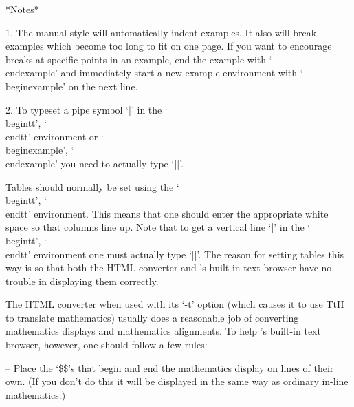 *Notes*

\beginlist%

\item{1.}
The manual style will automatically indent examples. It also will break
examples which become too long to fit on one page. If you want to encourage
breaks at specific points in an example, end the example with `\\endexample'
and immediately start a new example environment with `\\beginexample' on
the next line.

\item{2.}
To typeset a pipe symbol `|' in the `\\begintt', `\\endtt' environment or
`\\beginexample', `\\endexample' you need to actually type `||'.

\endlist


\indextt{\\matrix}
Tables  should  normally  be  set  using   the   `\\begintt',   `\\endtt'
environment. This means that one should enter the appropriate white space
so that columns line up. Note that to get a  vertical  line  `|'  in  the
`\\begintt', `\\endtt' environment  one  must  actually  type  `||'.  The
reason for setting tables this way is so that both the HTML converter and
{\GAP}'s built-in  text  browser  have  no  trouble  in  displaying  them
correctly.

The HTML converter when used with its `-t' option (which causes it to use
TtH to translate mathematics) usually does a reasonable job of converting
mathematics  displays  and  mathematics  alignments.  To  help   {\GAP}'s
built-in text browser, however, one should follow a few rules:

\beginlist%

\item{--} Place the `\$\$'s that begin and end the mathematics display on
lines of their own. (If you don't do this it will  be  displayed  in  the
same way as ordinary in-line mathematics.)

